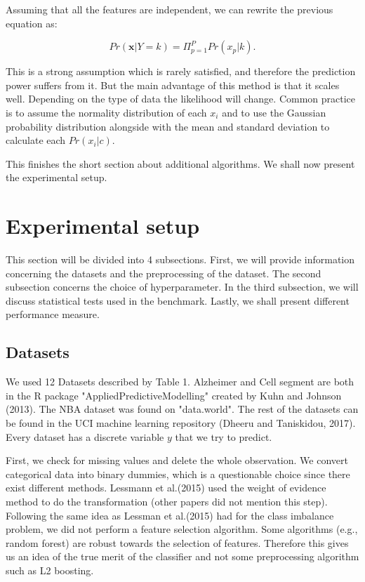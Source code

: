\documentclass[a4paper,12pt]{article}
\numberwithin{equation}{section}
\begin{document}
Assuming that all the features are independent, we can rewrite the previous equation as:

\begin{equation*}
Pr(\boldsymbol{x}|Y = k) = \Pi_{p=1}^PPr(x_p|k).
\end{equation*}

This is a strong assumption which is rarely satisfied, and therefore the prediction power suffers from it. But the main advantage of this method is that it scales well. Depending on the type of data the likelihood will change. Common practice is to assume the normality distribution of each $x_i$ and to use the Gaussian probability distribution alongside with the mean and standard deviation to calculate each $Pr(x_i|c)$.\par
This finishes the short section about additional algorithms. We shall now present the experimental setup.



\newpage


\section{Experimental setup}

This section will be divided into 4 subsections. First, we will provide information concerning the datasets and the preprocessing of the dataset. The second subsection concerns the choice of hyperparameter. In the third subsection, we will discuss statistical tests used in the benchmark. Lastly, we shall present different performance measure.

\subsection{Datasets}

We used 12 Datasets described by Table 1. Alzheimer and Cell segment are both in the R package "AppliedPredictiveModelling" created by Kuhn and Johnson (2013). The NBA dataset was found on "data.world". The rest of the datasets can be found in the UCI machine learning repository (Dheeru and Taniskidou, 2017). Every dataset has a discrete variable $y$ that we try to predict.  \par
First, we check for missing values and delete the whole observation. We convert categorical data into binary dummies, which is a questionable choice since there exist different methods. Lessmann et al.(2015) used the weight of evidence method to do the transformation (other papers did not mention this step).  Following the same idea as Lessman et al.(2015) had for the class imbalance problem, we did not perform a feature selection algorithm. Some algorithms (e.g., random forest) are robust towards the selection of features. Therefore this gives us an idea of the true merit of the classifier and not some preprocessing algorithm such as L2 boosting. 
\end{document}
